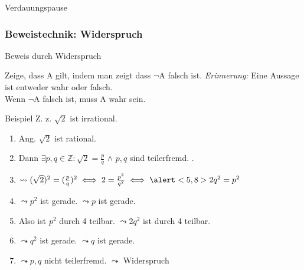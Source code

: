 \documentclass[10pt]{beamer}
\begin{document}
\begin{frame}[standout]
    Verdauungspause
\end{frame}

\subsubsection{Beweistechnik: Widerspruch}
\begin{frame}[fragile]{Beweis durch Widerspruch}
\small{
    \begin{alertblock}{Zeige, dass A gilt, indem man zeigt dass $\neg$A falsch ist.}
    \emph{Erinnerung:} Eine Aussage ist entweder wahr oder falsch.\\
    Wenn $\neg$A falsch ist, muss A wahr sein.
    \end{alertblock}
    \begin{exampleblock}{Beispiel}
        Z. z. $\sqrt{2}$ ist irrational.
        \begin{enumerate}
            \item<1-> \alert<1>{Ang. $\sqrt{2}$ ist rational.}
            \item<2-> \alert<2>{Dann $\exists p, q \in \mathbb{Z} : \sqrt{2} = \frac{p}{q}$} $\wedge$ \alert<3,11>{$p, q$ sind teilerfremd.}
            .
            \item<4-> $\leadsto(\sqrt{2})^2 = (\frac{p}{q})^2 \iff 2 = \frac{p^2}{q^2} \iff \alert<5,8>{2q^2=p^2}$
            \item<5-> \alert<5>{$\leadsto p^2$ ist gerade.} \alert<6,10>{$\leadsto p$ ist gerade.}
            \item<7-> \alert<7>{Also ist $p^2$ durch 4 teilbar.} \alert<8>{$\leadsto 2q^2$ ist durch 4 teilbar.}
            \item<9-> $\leadsto q^2$ ist gerade. \alert<10>{$\leadsto q$ ist gerade.}
            \item<10-> \alert<10>{$\leadsto p,q$ nicht teilerfremd.} \alert<11>{$\leadsto$ Widerspruch}
        \end{enumerate}
    \end{exampleblock}
}
\end{frame}
\end{document}

